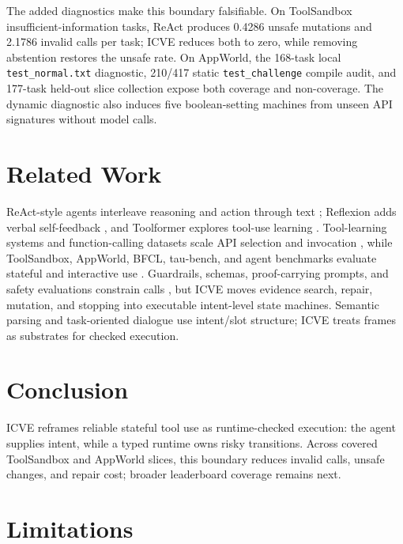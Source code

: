 \documentclass[11pt]{article}
\begin{document}
The added diagnostics make this boundary falsifiable. On ToolSandbox
insufficient-information tasks, ReAct produces 0.4286 unsafe mutations and 2.1786 invalid
calls per task; ICVE reduces both to zero, while removing abstention restores the unsafe
rate. On AppWorld, the 168-task local \texttt{test\_normal.txt} diagnostic, 210/417 static
\texttt{test\_challenge} compile audit, and 177-task held-out slice collection expose both
coverage and non-coverage. The dynamic diagnostic also induces five boolean-setting
machines from unseen API signatures without model calls.

\section{Related Work}
ReAct-style agents interleave reasoning and action through text \citep{yao2022react};
Reflexion adds verbal self-feedback \citep{shinn2023reflexion}, and Toolformer explores
tool-use learning \citep{schick2023toolformer}. Tool-learning systems and
function-calling datasets scale API selection and invocation
\citep{li2023apibank,shen2024smalltoollearners,qin2024toolllm,patil2024gorilla,
liu2025toolace,dang2025guidedtemplates}, while ToolSandbox, AppWorld, BFCL, tau-bench,
and agent benchmarks evaluate stateful and interactive use
\citep{lu2024toolsandbox,appworld2024,bfcl2024,taubench2024,liu2024agentbench,
zhou2024webarena,xie2024osworld,wang2025dialogtool}. Guardrails, schemas,
proof-carrying prompts, and safety evaluations constrain calls
\citep{ruan2024toolemu,xie2025toolsafety,faghih2025toolpreferences}, but ICVE moves
evidence search, repair, mutation, and stopping into executable intent-level state
machines. Semantic parsing and task-oriented dialogue use intent/slot structure; ICVE
treats frames as substrates for checked execution.

\section{Conclusion}

ICVE reframes reliable stateful tool use as runtime-checked execution: the agent supplies
intent, while a typed runtime owns risky transitions. Across covered ToolSandbox and
AppWorld slices, this boundary reduces invalid calls, unsafe changes, and repair cost;
broader leaderboard coverage remains next.

\section*{Limitations}
\end{document}
